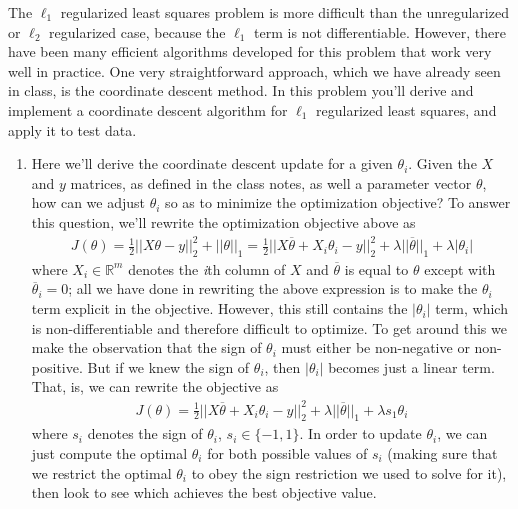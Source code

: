 \documentclass{article}
\begin{document}
The $\ell_1$ regularized least squares problem is more difficult than the unregularized or $\ell_2$ regularized case, because the $\ell_1$ term is not differentiable. However, there have been many efficient algorithms developed for this problem that work very well in practice. One very straightforward approach, which we have already seen in class, is the coordinate descent method. In this problem you’ll derive and implement a coordinate descent algorithm for $\ell_1$ regularized least squares, and apply it to test data.
\begin{enumerate}[label=(\alph*)]
    \item Here we’ll derive the coordinate descent update for a given $\theta_i$. Given the $X$ and $y$ matrices, as defined in the class notes, as well a parameter vector $\theta$, how can we adjust $\theta_i$ so as to minimize the optimization objective? To answer this question, we’ll rewrite the optimization objective above as
    \begin{align*}
        J(\theta) = \frac{1}{2}||X\theta - y||^2_2 + ||\theta||_1 = \frac{1}{2}||X\overline{\theta} +X_i\theta_i - y||^2_2 + \lambda||\overline{\theta}||_1 + \lambda|\theta_i|
    \end{align*}
    where $X_i \in \mathbb{R}^m$ denotes the \textit{i}th column of $X$ and $\overline{\theta}$ is equal to $\theta$ except with $\overline{\theta}_i = 0$; all we have done in rewriting the above expression is to make the $\theta_i$ term explicit in the objective. However, this still contains the $|\theta_i|$ term, which is non-differentiable and therefore difficult to optimize. To get around this we make the observation that the sign of $\theta_i$ must either be non-negative or non-positive. But if we knew the sign of $\theta_i$, then $|\theta_i|$ becomes just a linear term. That, is, we can rewrite the objective as
    \begin{align*}
    J(\theta) = \frac{1}{2}||X\overline{\theta} + X_i\theta_i - y||^2_2 + \lambda||\overline{\theta}||_1 + \lambda s_1 \theta_i
    \end{align*}
    where $s_i$ denotes the sign of $\theta_i$, $s_i \in \{-1, 1\}$. In order to update $\theta_i$, we can just compute the optimal $\theta_i$ for both possible values of $s_i$ (making sure that we restrict the optimal $\theta_i$ to obey the sign restriction we used to solve for it), then look to see which achieves the best objective value.
    

\end{enumerate}
\end{document}
